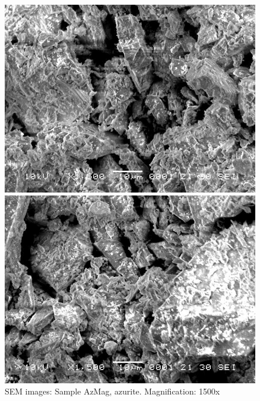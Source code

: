 \begin{figure}[H]
\centering
\begin{minipage}{.45\textwidth}
  \centering
  \includegraphics[width=\linewidth]{AzMag_x1500_1_160321}
\end{minipage}
\begin{minipage}{.45\textwidth}
  \centering
  \includegraphics[width=\linewidth]{AzMag_x1500_3_160321}
\end{minipage}
\caption[SEM images: Sample AzMag, azurite]{SEM images: Sample AzMag, azurite. Magnification: 1500x}
\label{fig:azmag_sem_4}
\end{figure}

